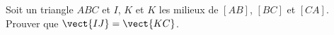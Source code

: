 
\begin{exercice}\label{exosmath-0142}

    Soit un triangle \( ABC\) et \( I\), \( K\) et \( K\) les milieux de \( [AB]\), \( [BC]\) et \( [CA]\). Prouver que \( \vect{ IJ }=\vect{ KC }\).

\end{exercice}
